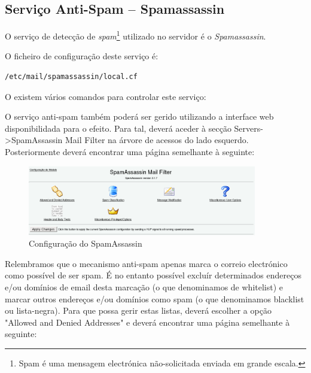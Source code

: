 \subsection{Serviço Anti-Spam -- Spamassassin}

O serviço de detecção de \emph{spam}\footnote{Spam é uma mensagem electrónica
não-solicitada enviada em grande escala.} utilizado no servidor é o
\emph{Spamassassin}.

O ficheiro de configuração deste serviço é:

\begin{Verbatim}[commandchars=\\\{\}]
/etc/mail/spamassassin/local.cf
\end{Verbatim}

O existem vários comandos para controlar este serviço:


O serviço anti-spam também poderá ser gerido utilizando a interface web disponibilidada para o efeito. Para tal, deverá aceder à secção Servers->SpamAssassin Mail Filter na árvore de acessos do lado esquerdo. Posteriormente deverá encontrar uma página semelhante à seguinte:

\begin{figure}[H]
    \begin{center}
        \includegraphics[width=10cm]{include/img/spam1}
    \end{center}
    \caption{Configuração do SpamAssassin}
    \label{fig:SPAM1}
\end{figure}

Relembramos que o mecanismo anti-spam apenas marca o correio electrónico como possível de ser spam. É no entanto possível excluír determinados endereços e/ou domínios de email desta marcação (o que denominamos de whitelist) e marcar outros endereços e/ou domínios como spam (o que denominamos blacklist ou lista-negra). Para que possa gerir estas listas, deverá escolher a opção "Allowed and Denied Addresses" e deverá encontrar uma página semelhante à seguinte:

